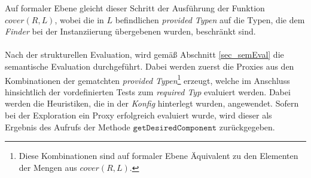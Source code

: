 Auf formaler Ebene gleicht dieser Schritt der Ausführung der Funktion $\mathit{cover(R,L)}$, wobei die in $L$ befindlichen \emph{provided Typen} auf die Typen, die dem \emph{Finder} bei der Instanziierung übergebenen wurden, beschränkt sind.
\\\\
Nach der strukturellen Evaluation, wird gemäß Abschnitt \ref{sec_semEval} die semantische Evaluation durchgeführt. Dabei werden zuerst die Proxies aus den Kombinationen der gematchten \emph{provided Typen}\footnote{Diese Kombinationen sind auf formaler Ebene Äquivalent zu den Elementen der Mengen aus $\mathit{cover(R,L)}$.} erzeugt, welche im Anschluss hinsichtlich der vordefinierten Tests zum \emph{required Typ} evaluiert werden. Dabei werden die Heuristiken, die in der \emph{Konfig} hinterlegt wurden, angewendet. Sofern bei der Exploration ein Proxy erfolgreich evaluiert wurde, wird dieser als Ergebnis des Aufrufs der Methode $\texttt{getDesiredComponent}$ zurückgegeben. 
